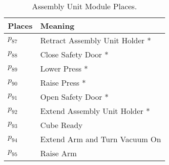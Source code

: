 \begin{table}[H]
\caption{Assembly Unit Module Places.}
\centering
\begin{tabular}{M{5cm}M{10cm}}
Places & Meaning\\
\hline
\hyperlink{partialNet:p871}{\hypertarget{partialTable:p87}{$p_{87}$}} & Retract Assembly Unit Holder *\\
\hyperlink{partialNet:p881}{\hypertarget{partialTable:p88}{$p_{88}$}} & Close Safety Door *\\
\hyperlink{partialNet:p891}{\hypertarget{partialTable:p89}{$p_{89}$}} & Lower Press *\\
\hyperlink{partialNet:p901}{\hypertarget{partialTable:p90}{$p_{90}$}} & Raise Press *\\
\hyperlink{partialNet:p911}{\hypertarget{partialTable:p91}{$p_{91}$}} & Open Safety Door *\\
\hyperlink{partialNet:p921}{\hypertarget{partialTable:p92}{$p_{92}$}} & Extend Assembly Unit Holder *\\
\hyperlink{partialNet:p931}{\hypertarget{partialTable:p93}{$p_{93}$}} & Cube Ready\\
\hyperlink{partialNet:p941}{\hypertarget{partialTable:p94}{$p_{94}$}} & Extend Arm and Turn Vacuum On\\
\hyperlink{partialNet:p951}{\hypertarget{partialTable:p95}{$p_{95}$}} & Raise Arm\\
\end{tabular}
\end{table}
